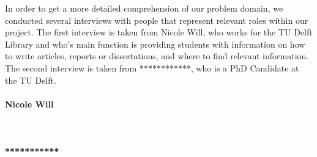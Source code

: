 In order to get a more detailed comprehension of our problem domain, we conducted several
interviews with people that represent relevant roles within our project. The first interview
is taken from Nicole Will, who works for the TU Delft Library and who's main function is 
providing students with information on how to write articles, reports or dissertations, and where to find relevant information. The second interview is taken from ************, who is a PhD Candidate at the TU Delft.

\paragraph{Nicole Will} ~



\paragraph{***********}

 